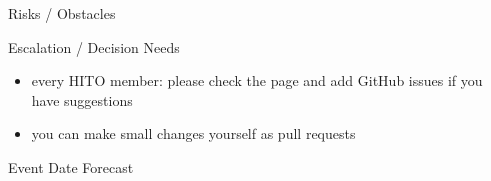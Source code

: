 \documentclass[]{kiesgrube}
\begin{document}
\begin{poster}
\begin{posterbox}[name=risks,column=1,below=open]{Risks / Obstacles}
\begin{itemize}
\end{itemize}
\end{posterbox}
\begin{posterbox}[name=escalation,column=1,below=risks]{Escalation / Decision Needs}
\begin{itemize}
\item every HITO member: please check the page and add GitHub issues if you have suggestions  
\item you can make small changes yourself as pull requests
\end{itemize}
\end{posterbox}
\begin{posterbox}[name=event,below=description,]{Event Date Forecast}
\end{posterbox}


\end{poster}
\end{document}
